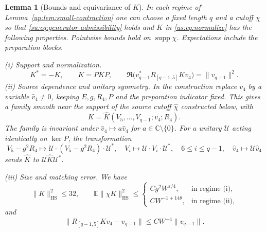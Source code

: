 \documentclass[11pt]{article}
\numberwithin{equation}{section}
\newtheorem{lemma}[theorem]{Lemma}
\theoremstyle{remark}
\newcommand{\E}{\mathbb E}
\newcommand{\C}{\mathbb C}
\newcommand{\supp}{\operatorname{supp}}
\newcommand{\HS}{\mathrm{HS}}
\begin{document}
\begin{lemma}[Bounds and equivariance of $K$]
\label{su:lem:chosen-generator}
In each regime of Lemma~\ref{up:lem:small-contraction} one can choose a
fixed length $q$ and a cutoff $\chi$ so that \eqref{su:eq:generator-admissibility}
holds and $K$ in \eqref{us:eq:normalize} has the following properties.
Pointwise bounds hold on $\supp\chi$. Expectations include the preparation blocks.

\smallskip\noindent
\textup{(i) Support and normalization.}
\begin{equation}\label{su:eq:chosen-generator-geometry}
 K^*=-K,\qquad K=PKP,\qquad
 \Re\bigl(v_{q-1}^*R_{[q-1,5]}Kv_4\bigr)=\|v_{q-1}\|^2.
\end{equation}
\smallskip\noindent
\textup{(ii) Source dependence and unitary symmetry.}
In the construction replace $v_4$ by a variable $\widehat v_4\ne0$,
keeping $E,g,R_4,P$ and the preparation indicator fixed. This gives a
family smooth near the support of the source cutoff $\widehat\chi$
constructed below, with
\begin{equation}\label{su:eq:generator-source-family}
 K=\widehat K(V_5,\ldots,V_{q-1};v_4;R_4).
\end{equation}
The family is invariant under $\widehat v_4\mapsto a\widehat v_4$ for
$a\in\C\setminus\{0\}$. For a unitary $\mathcal U$ acting identically
on $\ker P$, the transformation
\begin{equation}\label{su:eq:cut-generator-equivariance}
 V_5-g^2R_4\longmapsto\mathcal U\cdot(V_5-g^2R_4)\cdot\mathcal U^*,\quad
 V_i\longmapsto\mathcal U\cdot V_i\cdot\mathcal U^*,
       \quad6\le i\le q-1,\quad
 \widehat v_4\longmapsto\mathcal U\widehat v_4
\end{equation}
sends $\widehat K$ to $\mathcal U\widehat K\mathcal U^*$.

\smallskip\noindent
\textup{(iii) Size and matching error.}
We have
\begin{equation}\label{su:eq:pair-generator-size}
 \|K\|_{\HS}^2\le32,\qquad
 \E\|\chi K\|_{\HS}^2\le
 \begin{cases}
 Cg^2W^{\varepsilon/4},&\text{in regime (i)},\\
 CW^{-1+14\theta},&\text{in regime (ii)},
 \end{cases}
\end{equation}
and
\begin{equation}\label{su:eq:pair-matching-error}
 \|R_{[q-1,5]}Kv_4-v_{q-1}\|\le CW^{-4}\|v_{q-1}\|.
\end{equation}


\end{lemma}
\end{document}
